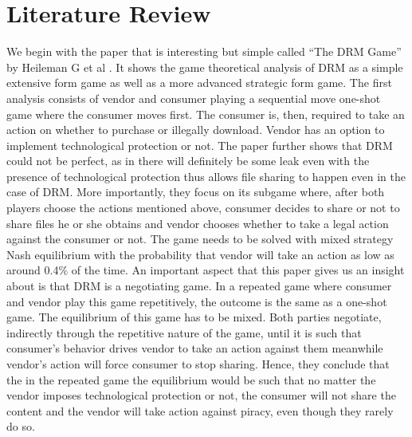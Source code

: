 \documentclass[a4paper,12pt]{article}
\numberwithin{equation}{section}
\begin{document}
\section{Literature Review}

We begin with the paper that is interesting but simple called ``The DRM Game'' by Heileman G et al \cite{heileman2007}. It shows the game theoretical analysis of DRM as a simple extensive form game as well as a more advanced strategic form game. The first analysis consists of vendor and consumer playing a sequential move one-shot game where the consumer moves first. The consumer is, then, required to take an action on whether to purchase or illegally download. Vendor has an option to implement technological protection or not. The paper further shows that DRM could not be perfect, as in there will definitely be some leak even with the presence of technological protection thus allows file sharing to happen even in the case of DRM. More importantly, they focus on its subgame where, after both players choose the actions mentioned above, consumer decides to share or not to share files he or she obtains and vendor chooses whether to take a legal action against the consumer or not. The game needs to be solved with mixed strategy Nash equilibrium with the probability that vendor will take an action as low as around 0.4\% of the time. An important aspect that this paper gives us an insight about is that DRM is a negotiating game. In a repeated game where consumer and vendor play this game repetitively, the outcome is the same as a one-shot game. The equilibrium of this game has to be mixed. Both parties negotiate, indirectly through the repetitive nature of the game, until it is such that consumer’s behavior drives vendor to take an action against them meanwhile vendor’s action will force consumer to stop sharing. Hence, they conclude that the in the repeated game the equilibrium would be such that no matter the vendor imposes technological protection or not, the consumer will not share the content and the vendor will take action against piracy, even though they rarely do so.\\
\end{document}
